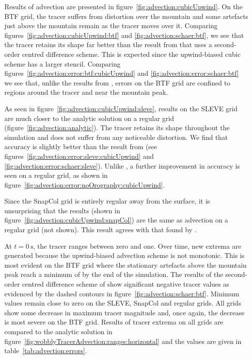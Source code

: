 Results of advection are presented in figure~\ref{fig:advection:cubicUpwind}.
On the BTF grid, the tracer suffers from distortion over the mountain and some artefacts just above the mountain remain as the tracer moves over it.  Comparing figures~\ref{fig:advection:cubicUpwind:btf} and \ref{fig:advection:schaer:btf}, we see that the tracer retains its shape far better than the result from \textcite{schaer2002} that uses a second-order centred difference scheme.  This is expected since the upwind-biased cubic scheme has a larger stencil.  Comparing figures~\ref{fig:advection:error:btf:cubicUpwind} and \ref{fig:advection:error:schaer:btf} we see that, unlike the results from \textcite{schaer2002}, errors on the BTF grid are confined to regions around the tracer and near the mountain peak.

As seen in figure~\ref{fig:advection:cubicUpwind:sleve}, results on the SLEVE grid are much closer to the analytic solution on a regular grid (figure~\ref{fig:advection:analytic}).  The tracer retains its shape throughout the simulation and does not suffer from any noticeable distortion.  We find that accuracy is slightly better than the result from \textcite{schaer2002} (see figures~\ref{fig:advection:error:sleve:cubicUpwind} and \ref{fig:advection:error:schaer:sleve}).  Unlike \textcite{schaer2002}, a further improvement in accuracy is seen on a regular grid, as shown in figure~\ref{fig:advection:error:noOrography:cubicUpwind}.

Since the SnapCol grid is entirely regular away from the surface, it is unsurprising that the results (shown in figure~\ref{fig:advection:cubicUpwind:snapCol}) are the same as advection on a regular grid (not shown).  This result agrees with that found by \textcite{good2013}.

At $t = \SI{0}{\second}$, the tracer ranges between zero and one.  Over time, new extrema are generated because the upwind-biased advection scheme is not monotonic.  This is most evident on the BTF grid where the stationary artefacts above the mountain peak reach a minimum of  by the end of the simulation.  The results of the second-order centred difference scheme of \textcite{schaer2002} show significant negative tracer values as evidenced by the dashed contours in figure~\ref{fig:advection:schaer:btf}.  Minimum values remain close to zero on the SLEVE, SnapCol and regular grids.  All grids show some decrease in maximum tracer magnitude and, once again, the decrease is most severe on the BTF grid.  Results of tracer extrema on all grids are compared to the analytic solution in figure~\ref{fig:wobblyTracerAdvection:ranges:horizontal} and the values are given in table~\ref{tab:advection:errors}.


